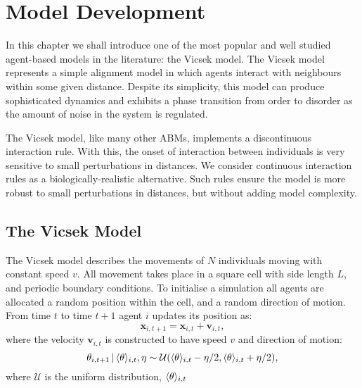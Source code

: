 \graphicspath{{fig/model_development/}}

\chapter{Model Development}
\label{cha:model_dev}

In this chapter we shall introduce one of the most popular and well studied agent-based
models in the literature: the Vicsek model. The Vicsek model represents a simple alignment
model in which agents interact with neighbours within some given distance. Despite its
simplicity, this model can produce sophisticated dynamics and exhibits a phase
transition from order to disorder as the amount of noise in the system is regulated.

The Vicsek model, like many other ABMs, implements a discontinuous interaction rule. With
this, the onset of interaction between individuals is very sensitive to small
perturbations in distances. We consider continuous interaction rules as a
biologically-realistic alternative. Such rules ensure the model is more robust to small
perturbations in distances, but without adding model complexity.

\section{The Vicsek Model}

The Vicsek model describes the movements of $N$ individuals moving with constant
speed $v$. All movement takes place in a square cell with side length $L$, and periodic
boundary conditions. To initialise a simulation all agents are allocated a random
position within the cell, and a random direction of motion. From time $t$ to time $t+1$
agent $i$ updates its position as:
\begin{equation*}
    \bm{x}_{i, t+1} = \bm{x}_{i, t} + \bm{v}_{i, t},
\end{equation*}
where the velocity $\bm{v}_{i,t}$ is constructed to have speed $v$ and direction of
motion:
\begin{equation*}
    \theta_{i, t+1} \,|\, \langle\theta\rangle_{i, t}, \eta \sim
                     \mathcal{U}(\langle\theta\rangle_{i, t} - \eta/2,
                                 \langle\theta\rangle_{i, t} + \eta/2),
\end{equation*}
where $\mathcal{U}$ is the uniform distribution, $\langle\theta\rangle_{i, t}$
